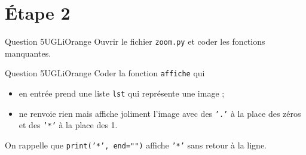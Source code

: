 \documentclass[a4paper,12pt,exos,firamath]{nsi}
\begin{document}
\section*{Étape 2}
\begin{encadrecolore}{Question 5}{UGLiOrange}
	Ouvrir le fichier \texttt{zoom.py} et coder les fonctions manquantes.	
\end{encadrecolore}

\begin{encadrecolore}{Question 5}{UGLiOrange}
	Coder la fonction \texttt{affiche} qui
	\begin{itemize}
		\item en entrée prend une liste \texttt{lst} qui représente une image ;
		\item ne renvoie rien mais affiche joliment l'image avec des \texttt{'.'}  à la place des zéros et des \texttt{'*'} à la place des 1.
	\end{itemize} 
	On rappelle que \texttt{print('*', end="")} affiche \texttt{'*'} sans retour à la ligne.
\end{encadrecolore}
\end{document}
